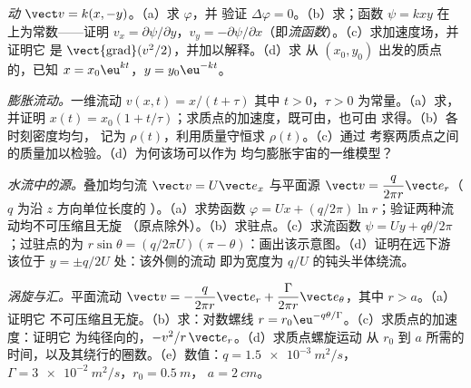 \begin{exercise}[$\star\star$]\label{exo:b2:fluid-kinematics:9}
\emph{动} $\vect v = k(x, -y)$。（a）求 $\varphi$，并
验证 $\Delta\varphi = 0$。（b）求；函数 $\psi = kxy$ 在
上为常数——证明 $v_x = \partial\psi/\partial y$，$v_y = -\partial\psi/
\partial x$（即\emph{流函数}）。（c）求加速度场，并证明它
是 $\operatorname{\vect{grad}}(v^2/2)$，并加以解释。（d）求
从 $(x_0, y_0)$ 出发的质点的，已知 $x = x_0\eu^{kt}$，$y = y_0\eu^{-kt}$。
\end{exercise}

\begin{exercise}[$\star\star\star$]\label{exo:b2:fluid-kinematics:10}
\emph{膨胀流动。}一维流动 $v(x, t) = x/(t + \tau)$
其中 $t > 0$，$\tau > 0$ 为常量。（a）求，并证明 $x(t) = x_0(1 +
t/\tau)$；求质点的加速度，既可由，也可由
求得。（b）各时刻密度均匀，
记为 $\rho(t)$，利用质量守恒求 $\rho(t)$。（c）通过
考察两质点之间的质量加以检验。（d）为何该场可以作为
均匀膨胀宇宙的一维模型？
\end{exercise}

\begin{exercise}[$\star\star\star$]\label{exo:b2:fluid-kinematics:11}
\emph{水流中的源。}叠加均匀流 $\vect v = U\vect e_x$
与平面源 $\vect v = \dfrac{q}{2\pi r}\vect e_r$（$q$ 为沿 $z$ 方向单位长度的
）。（a）求势函数 $\varphi = Ux +
(q/2\pi)\ln r$；验证两种流动均不可压缩且无旋
（原点除外）。（b）求驻点。（c）求流函数 $\psi
= Uy + q\theta/2\pi$；过驻点的为
$r\sin\theta = (q/2\pi U)(\pi - \theta)$：画出该示意图。（d）证明在远下游
该位于 $y = \pm q/2U$ 处：该外侧的流动
即为宽度为 $q/U$ 的钝头半体绕流。
\end{exercise}

\begin{exercise}[$\star\star\star$]\label{exo:b2:fluid-kinematics:12}
\emph{涡旋与汇。}平面流动 $\vect v = -\dfrac{q}{2\pi r}\vect e_r +
\dfrac{\Gamma}{2\pi r}\vect e_\theta$，其中 $r > a$。（a）证明它
不可压缩且无旋。（b）求：对数螺线
$r = r_0\eu^{-q\theta/\Gamma}$。（c）求质点的加速度：证明它
为纯径向的，$-v^2/r\,\vect e_r$。（d）求质点螺旋运动
从 $r_0$ 到 $a$ 所需的时间，以及其绕行的圈数。（e）数值：$q =
\qty{1.5e-3}{m^2/s}$，$\Gamma = \qty{3e-2}{m^2/s}$，$r_0 = \qty{0.5}{m}$，
$a = \qty{2}{cm}$。
\end{exercise}

